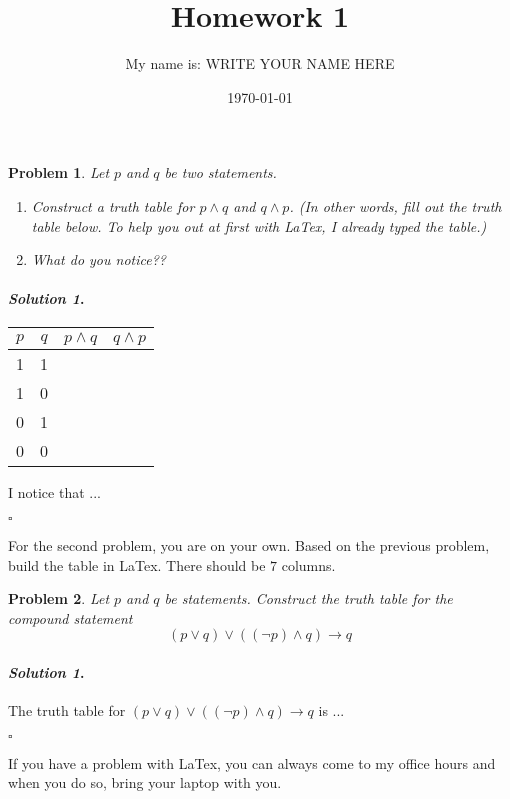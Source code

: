 \documentclass{amsart}
\theoremstyle{plain}
\newtheorem{problem}{Problem}
\newenvironment{solution}{\paragraph{\emph{Solution 1}.}}{\hfill$\square$}
\begin{document}
 

\title[Homework 1]{Homework 1}
\author{My name is:  WRITE YOUR NAME HERE}  %
\date{\today} 
\maketitle 

\begin{problem}
Let $p$ and $q$ be two statements.  
\begin{enumerate}
\item Construct a truth table for $p \land q$ and $q \land p$.  (In other words, fill out the truth table below.  To help you out at first with LaTex, I already typed the table.)
\item What do you notice??
\end{enumerate}
\end{problem}

\begin{solution}
\begin{center}
\begin{tabular}{c|c|c|c}
$p$ & $q$ & $p \land q$ & $q \land p$  \\
\hline
 1 & 1 & & \\
 1 & 0 & & \\
 0 & 1 & & \\
 0 & 0 & &
\end{tabular}
\end{center}
I notice that ...

\end{solution}

For the second problem, you are on your own.  Based on the previous problem, build the table in LaTex.  There should be $7$ columns.
\begin{problem}
Let $p$ and $q$ be statements.  Construct the truth table for the compound statement
$$(p \lor q) \lor ((\neg p) \land q) \to q $$
\end{problem}

\begin{solution}
The truth table for $(p \lor q) \lor ((\neg p) \land q) \to q$ is ... 

\end{solution}

If you have a problem with LaTex, you can always come to my office hours and when you do so, bring your laptop with you.
\end{document}
